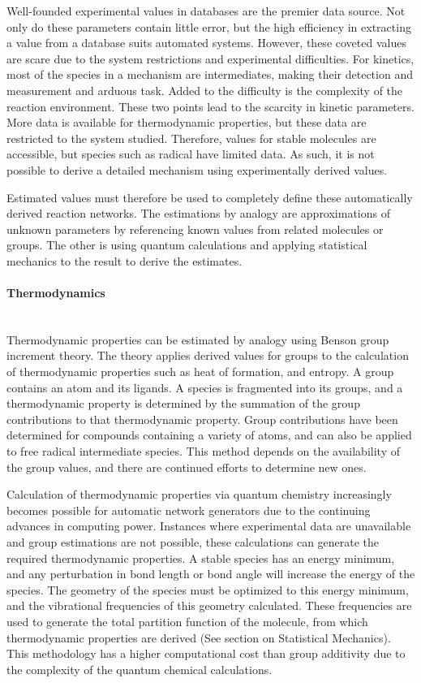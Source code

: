 \documentclass[12pt]{article}
\begin{document}
Well-founded experimental values in databases are the premier data source. Not only do these parameters contain little error, but the high efficiency in extracting a value from a database suits automated systems. However, these coveted values are scare due to the system restrictions and experimental difficulties. For kinetics, most of the species in a mechanism are intermediates, making their detection and measurement and arduous task. Added to the difficulty is the complexity of the reaction environment. These two points lead to the scarcity in kinetic parameters. More data is available for thermodynamic properties, but these data are restricted to the system studied. Therefore, values for stable molecules are accessible, but species such as radical have limited data.  As such, it is not possible to derive a detailed mechanism using experimentally derived values.

Estimated values must therefore be used to completely define these automatically derived reaction networks. The estimations by analogy are approximations of unknown parameters by referencing known values from related molecules or groups. The other is using quantum calculations and applying statistical mechanics to the result to derive the estimates.

\paragraph{Thermodynamics}\mbox{}\\
Thermodynamic properties can be estimated by analogy using Benson group increment theory. The theory applies derived values for groups to the calculation of thermodynamic properties such as heat of formation, and entropy. A group contains an atom and its ligands. A species is fragmented into its groups, and a thermodynamic property is determined by the summation of the group contributions to that thermodynamic property. Group contributions have been determined for compounds containing a variety of atoms, and can also be applied to free radical intermediate species. This method depends on the availability of the group values, and there are continued efforts to determine new ones.

Calculation of thermodynamic properties via quantum chemistry increasingly becomes possible for automatic network generators due to the continuing advances in computing power. Instances where experimental data are unavailable and group estimations are not possible, these calculations can generate the required thermodynamic properties. A stable species has an energy minimum, and any perturbation in bond length or bond angle will increase the energy of the species. The geometry of the species must be optimized to this energy minimum, and the vibrational frequencies of this geometry calculated. These frequencies are used to generate the total partition function of the molecule, from which thermodynamic properties are derived (See section on Statistical Mechanics). This methodology has a higher computational cost than group additivity due to the complexity of the quantum chemical calculations.
\end{document}
